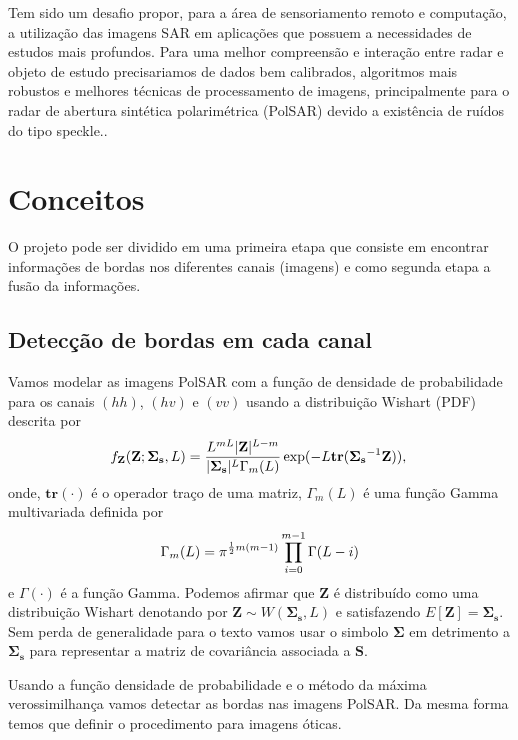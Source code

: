 \documentclass[runningheads]{llncs}
\begin{document}
Tem sido um desafio propor, para a área de sensoriamento remoto e computação, a utilização das imagens SAR em aplicações que possuem a necessidades de estudos mais profundos. Para uma melhor compreensão e interação entre radar e objeto de estudo precisariamos de dados bem calibrados, algoritmos mais robustos e melhores técnicas de processamento de imagens, principalmente para o radar de abertura sintética polarimétrica (PolSAR) devido a existência de ruídos do tipo speckle..

\section{Conceitos}
O projeto pode ser dividido em uma primeira etapa que consiste em encontrar informações de bordas nos diferentes canais (imagens) e como segunda etapa a fusão da informações. 
\subsection{Detecção de bordas em cada canal}
 Vamos modelar as imagens PolSAR com a função de densidade de probabilidade para os canais $(hh)$, $(hv)$ e $(vv)$ usando a distribuição Wishart (PDF) descrita por
\begin{equation}
    f_{\mathbf{Z}}(\mathbf{Z};\mathbf{\Sigma_{s}},L)=\frac{L^{mL}|\mathbf{Z}|^{L-m}}{|\mathbf{\Sigma_{s}}|^{L}\Gamma_m(L)} \exp(-L\mathbf{tr}(\mathbf{\Sigma_{s}}^{-1}\mathbf{Z})), \\
\end{equation} 
onde, $\mathbf{tr}(\cdot)$ é o operador traço de uma matriz, $\Gamma_m(L)$ é uma função Gamma multivariada definida por
\begin{equation}\label{cap_acf_10}
	\Gamma_m(L)=\pi^{\frac{1}{2}m(m-1)} \prod_{i=0}^{m-1}\Gamma(L-i) \\
\end{equation}
e $\Gamma(\cdot)$ é a função Gamma. Podemos afirmar que $\mathbf{Z}$ é distribuído como uma distribuição Wishart denotando por $\mathbf{Z}\sim W(\mathbf{\Sigma_{s}}, L)$ e satisfazendo $E[\mathbf{Z}]=\mathbf{\Sigma_{s}}$. Sem perda de generalidade para o texto vamos usar o simbolo $\mathbf{\Sigma}$ em detrimento a $\mathbf{\Sigma_{s}}$ para representar a matriz de covariância associada a $\mathbf{S}$.
 
Usando a função densidade de probabilidade e o método da máxima verossimilhança vamos detectar as bordas nas imagens PolSAR. Da mesma forma temos que definir o procedimento para imagens óticas. 
\end{document}
